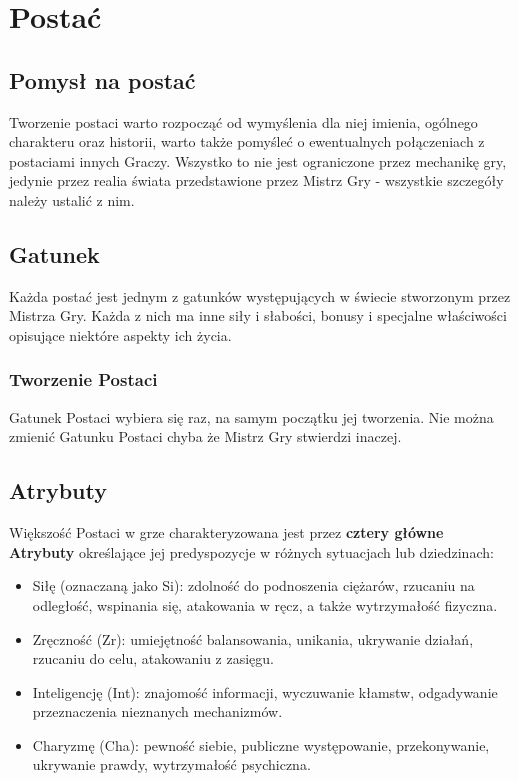 \documentclass[10pt,a4paper]{book}
\begin{document}
\section{Postać}
\begin{multicols}{2}

\subsection*{Pomysł na postać}
Tworzenie postaci warto rozpocząć od wymyślenia dla niej imienia, ogólnego charakteru oraz historii, warto także pomyśleć o ewentualnych połączeniach z postaciami innych Graczy. Wszystko to nie jest ograniczone przez mechanikę gry, jedynie przez realia świata przedstawione przez Mistrz Gry - wszystkie szczegóły należy ustalić z nim.


\subsection*{Gatunek}
Każda postać jest jednym z gatunków występujących w świecie stworzonym przez Mistrza Gry. Każda z nich ma inne siły i słabości, bonusy i specjalne właściwości opisujące niektóre aspekty ich życia.

\subsubsection*{Tworzenie Postaci}
Gatunek Postaci wybiera się raz, na samym początku jej tworzenia. Nie można zmienić Gatunku Postaci chyba że Mistrz Gry stwierdzi inaczej.


\subsection*{Atrybuty}
Większość Postaci w grze charakteryzowana jest przez \textbf{cztery główne Atrybuty} określające jej predyspozycje w różnych sytuacjach lub dziedzinach:
\begin{itemize}
	\item Siłę (oznaczaną jako Si): zdolność do podnoszenia ciężarów, rzucaniu na odległość, wspinania się, atakowania w ręcz, a także wytrzymałość fizyczna.
	\item Zręczność (Zr): umiejętność balansowania, unikania, ukrywanie działań, rzucaniu do celu, atakowaniu z zasięgu.
	\item Inteligencję (Int): znajomość informacji, wyczuwanie kłamstw, odgadywanie przeznaczenia nieznanych mechanizmów.
	\item Charyzmę (Cha): pewność siebie, publiczne występowanie, przekonywanie, ukrywanie prawdy, wytrzymałość psychiczna.
\end{itemize}


\end{multicols}
\end{document}
